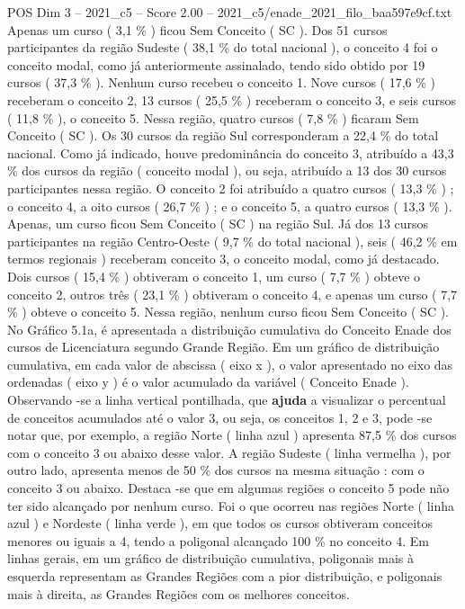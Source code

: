 \begin{textsample}{POS Dim 3 – 2021\_c5 – Score 2.00 – 2021\_c5/enade\_2021\_filo\_baa597e9cf.txt}
Apenas um curso ( 3,1 \% ) ficou Sem Conceito ( SC ).
Dos 51 cursos participantes da região Sudeste ( 38,1 \% do total nacional ), o conceito 4 foi o conceito modal, como já anteriormente assinalado, tendo sido obtido por 19 cursos ( 37,3 \% ).
Nenhum curso recebeu o conceito 1.
Nove cursos ( 17,6 \% ) receberam o conceito 2, 13 cursos ( 25,5 \% ) receberam o conceito 3, e seis cursos ( 11,8 \% ), o conceito 5.
Nessa região, quatro cursos ( 7,8 \% ) ficaram Sem Conceito ( SC ).
Os 30 cursos da região Sul corresponderam a 22,4 \% do total nacional.
Como já indicado, houve predominância do conceito 3, atribuído a 43,3 \% dos cursos da região ( conceito modal ), ou seja, atribuído a 13 dos 30 cursos participantes nessa região.
O conceito 2 foi atribuído a quatro cursos ( 13,3 \% ) ; o conceito 4, a oito cursos ( 26,7 \% ) ; e o conceito 5, a quatro cursos ( 13,3 \% ).
Apenas, um curso ficou Sem Conceito ( SC ) na região Sul.
Já dos 13 cursos participantes na região Centro-Oeste ( 9,7 \% do total nacional ), seis ( 46,2 \% em termos regionais ) receberam conceito 3, o conceito modal, como já destacado.
Dois cursos ( 15,4 \% ) obtiveram o conceito 1, um curso ( 7,7 \% ) obteve o conceito 2, outros três ( 23,1 \% ) obtiveram o conceito 4, e apenas um curso ( 7,7 \% ) obteve o conceito 5.
Nessa região, nenhum curso ficou Sem Conceito ( SC ).
No Gráfico 5.1a, é apresentada a distribuição cumulativa do Conceito Enade dos cursos de Licenciatura segundo Grande Região.
Em um gráfico de distribuição cumulativa, em cada valor de abscissa ( eixo x ), o valor apresentado no eixo das ordenadas ( eixo y ) é o valor acumulado da variável ( Conceito Enade ).
Observando -se a linha vertical pontilhada, que \textbf{ajuda} a visualizar o percentual de conceitos acumulados até o valor 3, ou seja, os conceitos 1, 2 e 3, pode -se notar que, por exemplo, a região Norte ( linha azul ) apresenta 87,5 \% dos cursos com o conceito 3 ou abaixo desse valor.
A região Sudeste ( linha vermelha ), por outro lado, apresenta menos de 50 \% dos cursos na mesma situação : com o conceito 3 ou abaixo.
Destaca -se que em algumas regiões o conceito 5 pode não ter sido alcançado por nenhum curso.
Foi o que ocorreu nas regiões Norte ( linha azul ) e Nordeste ( linha verde ), em que todos os cursos obtiveram conceitos menores ou iguais a 4, tendo a poligonal alcançado 100 \% no conceito 4.
Em linhas gerais, em um gráfico de distribuição cumulativa, poligonais mais à esquerda representam as Grandes Regiões com a pior distribuição, e poligonais mais à direita, as Grandes Regiões com os melhores conceitos.

\end{textsample}
